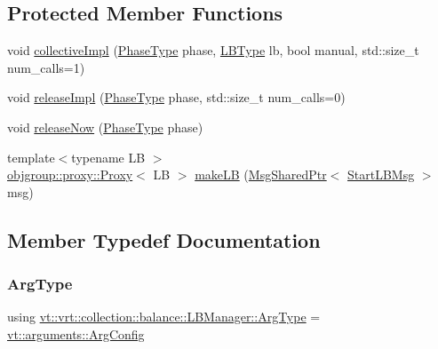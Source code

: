 \subsection*{Protected Member Functions}
\begin{DoxyCompactItemize}
\item 
void \hyperlink{structvt_1_1vrt_1_1collection_1_1balance_1_1_l_b_manager_a591eef7303a18ce4ef2fd35cfecbf512}{collective\+Impl} (\hyperlink{namespacevt_a46ce6733d5cdbd735d561b7b4029f6d7}{Phase\+Type} phase, \hyperlink{namespacevt_1_1vrt_1_1collection_1_1balance_ac4f99693509affcc67db182d4aad9b5c}{L\+B\+Type} lb, bool manual, std\+::size\+\_\+t num\+\_\+calls=1)
\item 
void \hyperlink{structvt_1_1vrt_1_1collection_1_1balance_1_1_l_b_manager_a7e05ed9957f272ac5cc8b999f66fa403}{release\+Impl} (\hyperlink{namespacevt_a46ce6733d5cdbd735d561b7b4029f6d7}{Phase\+Type} phase, std\+::size\+\_\+t num\+\_\+calls=0)
\item 
void \hyperlink{structvt_1_1vrt_1_1collection_1_1balance_1_1_l_b_manager_a6ed483eb58a583c48f430276c2f25c14}{release\+Now} (\hyperlink{namespacevt_a46ce6733d5cdbd735d561b7b4029f6d7}{Phase\+Type} phase)
\item 
{\footnotesize template$<$typename LB $>$ }\\\hyperlink{structvt_1_1objgroup_1_1proxy_1_1_proxy}{objgroup\+::proxy\+::\+Proxy}$<$ LB $>$ \hyperlink{structvt_1_1vrt_1_1collection_1_1balance_1_1_l_b_manager_abccd80f12ce1ced9e22f32f886a9acf6}{make\+LB} (\hyperlink{namespacevt_ab2b3d506ec8e8d1540aede826d84a239}{Msg\+Shared\+Ptr}$<$ \hyperlink{structvt_1_1vrt_1_1collection_1_1balance_1_1_start_l_b_msg}{Start\+L\+B\+Msg} $>$ msg)
\end{DoxyCompactItemize}


\subsection{Member Typedef Documentation}
\mbox{\label{structvt_1_1vrt_1_1collection_1_1balance_1_1_l_b_manager_a25c1321de5a8a52b7c2c5d0d400d55d4}} 
\subsubsection{\texorpdfstring{Arg\+Type}{ArgType}}
{\footnotesize\ttfamily using \hyperlink{structvt_1_1vrt_1_1collection_1_1balance_1_1_l_b_manager_a25c1321de5a8a52b7c2c5d0d400d55d4}{vt\+::vrt\+::collection\+::balance\+::\+L\+B\+Manager\+::\+Arg\+Type} =  \hyperlink{structvt_1_1arguments_1_1_arg_config}{vt\+::arguments\+::\+Arg\+Config}}

